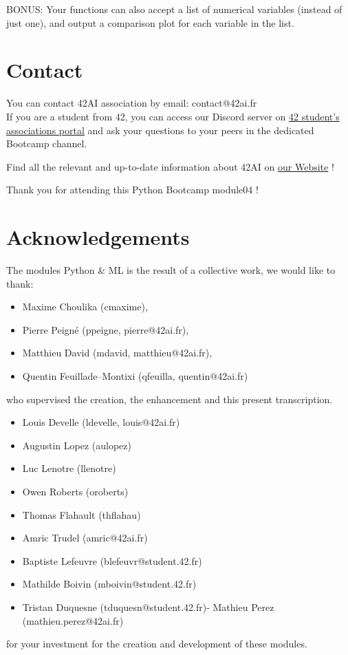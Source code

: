\documentclass{42-en}
\begin{document}
BONUS: Your functions can also accept a list of numerical variables (instead of just one), and output a comparison plot for each variable in the list.


\newpage

\section*{Contact}
You can contact 42AI association by email: contact@42ai.fr\\

If you are a student from 42, you can access our Discord server 
on \href{https://discord.com/channels/887850395697807362/887850396314398720}{42 student's associations portal} and ask your
questions to your peers in the dedicated Bootcamp channel. 

Find all the relevant and up-to-date information about 42AI on \href{https://42-ai.github.io}{our Website} ! 

Thank you for attending this Python Bootcamp module04 !
\section*{Acknowledgements}
The modules Python \& ML is the result of a collective work, we would like to thank:
\begin{itemize}
  \item Maxime Choulika (cmaxime),
  \item Pierre Peigné (ppeigne, pierre@42ai.fr),
  \item Matthieu David (mdavid, matthieu@42ai.fr),
  \item Quentin Feuillade--Montixi (qfeuilla, quentin@42ai.fr)
\end{itemize}
who supervised the creation, the enhancement and this present transcription.

\begin{itemize}
    \item Louis Develle (ldevelle, louis@42ai.fr)
    \item Augustin Lopez (aulopez)
    \item Luc Lenotre (llenotre)
    \item Owen Roberts (oroberts)
    \item Thomas Flahault (thflahau)
    \item Amric Trudel (amric@42ai.fr)
    \item Baptiste Lefeuvre (blefeuvr@student.42.fr)
    \item Mathilde Boivin (mboivin@student.42.fr)
    \item Tristan Duquesne (tduquesn@student.42.fr)- Mathieu Perez (mathieu.perez@42ai.fr)
\end{itemize}
for your investment for the creation and development of these modules.
\end{document}
